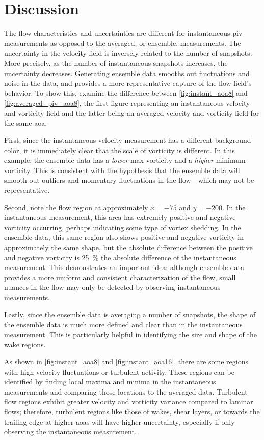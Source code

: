 \chapter{Discussion} \label{cp:discussion}

The flow characteristics and uncertainties are different for instantaneous \acrshort{piv} measurements as opposed to the averaged, or ensemble, measurements. The uncertainty in the velocity field is inversely related to the number of snapshots. More precisely, as the number of instantaneous snapshots increases, the uncertainty decreases. Generating ensemble data smooths out fluctuations and noise in the data, and provides a more representative capture of the flow field's behavior. To show this, examine the difference between \autoref{fig:instant_aoa8} and \autoref{fig:averaged_piv_aoa8}, the first figure representing an instantaneous velocity and vorticity field and the latter being an averaged velocity and vorticity field for the same \acrshort{aoa}.

First, since the instantaneous velocity measurement has a different background color, it is immediately clear that the scale of vorticity is different. In this example, the ensemble data has a \textit{lower} max vorticity and a \textit{higher} minimum vorticity. This is consistent with the hypothesis that the ensemble data will smooth out outliers and momentary fluctuations in the flow—which may not be representative.

Second, note the flow region at approximately $x=-75$ and $y=-200$. In the instantaneous measurement, this area has extremely positive and negative vorticity occurring, perhaps indicating some type of vortex shedding. In the ensemble data, this same region also shows positive and negative vorticity in approximately the same shape, but the absolute difference between the positive and negative vorticity is \qty{25}{\percent} the absolute difference of the instantaneous measurement. This demonstrates an important idea: although ensemble data provides a more uniform and consistent characterization of the flow, small nuances in the flow may only be detected by observing instantaneous measurements.

Lastly, since the ensemble data is averaging a number of snapshots, the shape of the ensemble data is much more defined and clear than in the instantaneous measurement. This is particularly helpful in identifying the size and shape of the wake regions.

As shown in \autoref{fig:instant_aoa8} and \autoref{fig:instant_aoa16}, there are some regions with high velocity fluctuations or turbulent activity. These regions can be identified by finding local maxima and minima in the instantaneous measurements and comparing those locations to the averaged data. Turbulent flow regions exhibit greater velocity and vorticity variance compared to laminar flows; therefore, turbulent regions like those of wakes, shear layers, or towards the trailing edge at higher \acrshort{aoa}s will have higher uncertainty, especially if only observing the instantaneous measurement.

